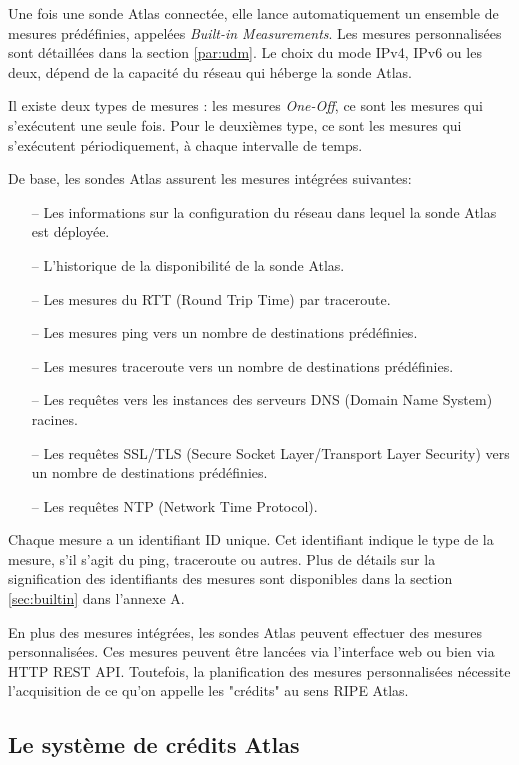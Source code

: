 Une fois une sonde  Atlas connectée, elle lance automatiquement un ensemble de mesures prédéfinies, appelées \textit{Built-in Measurements}. Les mesures personnalisées sont détaillées dans la section \ref{par:udm}. Le choix du mode  IPv4,  IPv6 ou les deux, dépend de la capacité du réseau qui héberge la sonde  Atlas.  

Il existe deux types de mesures : les mesures \textit{One-Off}, ce sont les mesures qui s'exécutent une seule fois. Pour le deuxièmes type, ce sont les mesures qui s'exécutent   périodiquement, à chaque intervalle de temps. 

De base, les sondes Atlas assurent les mesures intégrées  suivantes: 

\begin{itemize}
	\item[--] Les informations sur la configuration du réseau dans lequel la sonde Atlas est déployée.
	\item[--] L'historique de la disponibilité de la sonde Atlas.
	\item[--] Les mesures du  RTT (Round Trip Time) par traceroute.
	\item[--] Les mesures ping vers un nombre de destinations prédéfinies.
	\item[--] Les mesures traceroute vers un nombre de destinations prédéfinies.
	\item[--] Les requêtes vers les instances des serveurs DNS (Domain Name System) racines.
	\item[--] Les requêtes SSL/TLS (Secure Socket Layer/Transport Layer Security) vers un nombre de destinations prédéfinies.
	\item[--] Les requêtes NTP (Network Time Protocol).
\end{itemize}

Chaque mesure a un identifiant ID unique. Cet identifiant indique le type de la mesure, s'il s'agit du ping, traceroute ou autres. Plus de détails sur la signification des identifiants des mesures sont disponibles dans la section  \ref{sec:builtin} dans l'annexe A.

En plus des mesures intégrées, les sondes Atlas peuvent effectuer des mesures personnalisées. Ces mesures peuvent être lancées via l'interface web \cite{create-UDM} ou bien via  HTTP REST API. Toutefois, la planification des  mesures personnalisées nécessite l'acquisition de ce qu'on appelle les "crédits" au sens RIPE Atlas.  

\subsection{Le système de crédits Atlas} \label{credits-atlas}

